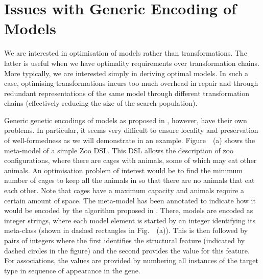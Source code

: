\section{Issues with Generic Encoding of Models}
\label{section:issues}


  We are interested in optimisation of models rather than transformations. The latter is useful when we have optimality requirements over transformation chains. More typically, we are interested
	simply in deriving optimal models. In such a case, optimising transformations incurs too much overhead in repair and through redundant representations of the same model through different
	transformation chains (effectively reducing the size of the search population).
	
	Generic genetic encodings of models as proposed in \cite{Kessentini+13,Williams13,Efstathiou+14b}, however, have their own problems. In particular, it seems very difficult to ensure locality and
	preservation of well-formedness as we will demonstrate in an example. Figure~~(a) shows the meta-model of a simple Zoo DSL. This DSL allows the description of zoo configurations,
	where there are cages with animals, some of which may eat other animals. An optimisation problem of interest would be to find the minimum number of cages to keep all the animals in so that there are
	no animals that eat each other. Note that cages have a maximum capacity and animals require a certain amount of space. The meta-model has been annotated to indicate how it would be encoded by the
	algorithm proposed in \cite{Williams13}. There, models are encoded as integer strings, where each model element is started by an integer identifying its meta-class (shown in dashed rectangles in 
	Fig.~~(a)). This is then followed by pairs of integers where the first identifies the structural feature (indicated by dashed circles in the figure) and the second provides the
	value for this feature. For associations, the values are provided by numbering all instances of the target type in sequence of appearance in the gene.
	
